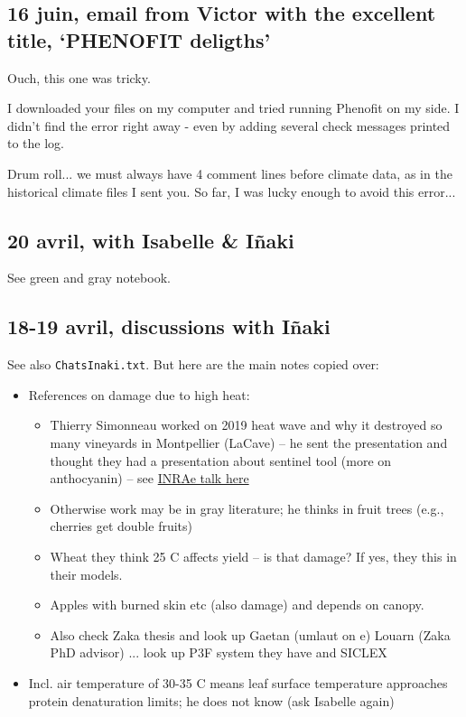 \documentclass[11pt,letter]{article}
\begin{document}
\subsection{16 juin, email from Victor with the excellent title, `PHENOFIT deligths'}

Ouch, this one was tricky.

I downloaded your files on my computer and tried running Phenofit on my side.
I didn’t find the error right away - even by adding several check messages printed to the log.

Drum roll... we must always have 4 comment lines before climate data, as in the historical climate files I sent you.
So far, I was lucky enough to avoid this error... 

\subsection{20 avril, with Isabelle \& I\~naki}
See green and gray notebook. 

\subsection{18-19 avril, discussions with I\~naki}

See also \verb|ChatsInaki.txt|. But here are the main notes copied over:
\begin{itemize}
\item References on damage due to high heat: 
\begin{itemize}
\item Thierry Simonneau worked on 2019 heat wave and why it destroyed so many vineyards in Montpellier (LaCave) -- he sent the presentation and thought they had a presentation about sentinel tool (more on anthocyanin) -- see \href{https://www6.inrae.fr/laccave/content/download/3466/35052/version/2/file/Canicule_Simonneau_25112021.pdf}{INRAe talk here}
\item Otherwise work may be in gray literature; he thinks in fruit trees (e.g., cherries get double fruits)
\item Wheat they think 25 C affects yield -- is that damage? If yes, they this in their models. 
\item  Apples with burned skin etc (also damage) and depends on canopy. 
\item Also check Zaka thesis and look up Gaetan (umlaut on e) Louarn (Zaka PhD advisor) ... look up P3F system they have and SICLEX
\end{itemize}
\item Incl. air temperature of 30-35 C means leaf surface temperature approaches protein denaturation limits; he does not know (ask Isabelle again)
\end{itemize}
\end{document}
